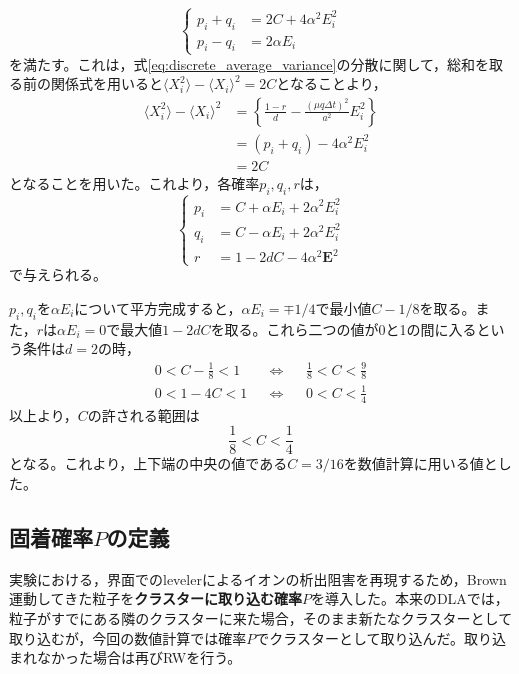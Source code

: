 \documentclass[autodetect-engine,dvi=dvipdfmx,a4paper,ja=standard,oneside,openany,11pt,draft]{bxjsbook}
\begin{document}
\begin{equation}
  \left\{
  \begin{aligned}
    p_i+q_i & =2C+4\alpha^2E_i^2 \\
    p_i-q_i & =2\alpha E_i
  \end{aligned}
  \right.
  \label{eq:prob}
\end{equation}
を満たす。これは，式\eqref{eq:discrete_average_variance}の分散に関して，総和を取る前の関係式を用いると$\langle X_i^2\rangle-\langle X_i\rangle^2=2C$となることより，
\begin{equation}
  \begin{split}
    \langle X_i^2\rangle-\langle X_i\rangle^2 & =\left\{\frac{1-r}{d}-\frac{(\mu q \Delta t)^2}{a^2}E_i^2\right\} \\
                                              & =(p_i+q_i)-4\alpha^2E_i^2                                         \\
                                              & =2C
  \end{split}
  \label{eq:prob_middle}
\end{equation}
となることを用いた。これより，各確率$p_i,q_i,r$は，
\begin{equation}
  \left\{
  \begin{aligned}
    p_i & =C+\alpha E_i+2\alpha^2 E_i^2 \\
    q_i & =C-\alpha E_i+2\alpha^2 E_i^2 \\
    r   & =1-2dC-4\alpha^2\bm{E}^2
  \end{aligned}
  \right.
  \label{eq:prob3}
\end{equation}
で与えられる。

$p_i,q_i$を$\alpha E_i$について平方完成すると，$\alpha E_i=\mp1/4$で最小値$C-1/8$を取る。また，$r$は$\alpha E_i=0$で最大値$1-2dC$を取る。これら二つの値が0と1の間に入るという条件は$d=2$の時，
\begin{align}
  0<C-\frac{1}{8}<1 &  & \Leftrightarrow &  & \frac{1}{8}<C<\frac{9}{8} \\
  0<1-4C<1          &  & \Leftrightarrow &  & 0<C<\frac{1}{4}
  \label{eq:condition}
\end{align}
以上より，$C$の許される範囲は
\begin{equation}
  \frac{1}{8}<C<\frac{1}{4}
  \label{eq:condition2}
\end{equation}
となる。これより，上下端の中央の値である$C=3/16$を数値計算に用いる値とした。
\subsection{固着確率$P$の定義}
実験における，界面でのlevelerによるイオンの析出阻害を再現するため，Brown運動してきた粒子を\textbf{クラスターに取り込む確率$P$}を導入した。本来のDLAでは，粒子がすでにある隣のクラスターに来た場合，そのまま新たなクラスターとして取り込むが，今回の数値計算では確率$P$でクラスターとして取り込んだ。取り込まれなかった場合は再びRWを行う。
\end{document}
